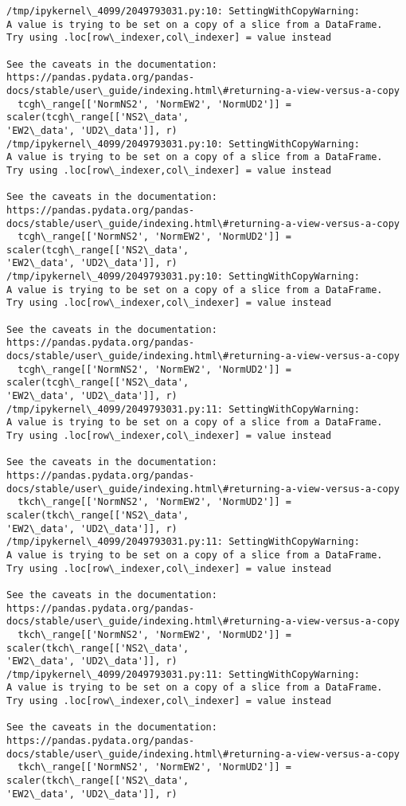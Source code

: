 \documentclass[11pt]{article}
\begin{document}
    \begin{Verbatim}[commandchars=\\\{\}]
/tmp/ipykernel\_4099/2049793031.py:10: SettingWithCopyWarning:
A value is trying to be set on a copy of a slice from a DataFrame.
Try using .loc[row\_indexer,col\_indexer] = value instead

See the caveats in the documentation: https://pandas.pydata.org/pandas-
docs/stable/user\_guide/indexing.html\#returning-a-view-versus-a-copy
  tcgh\_range[['NormNS2', 'NormEW2', 'NormUD2']] = scaler(tcgh\_range[['NS2\_data',
'EW2\_data', 'UD2\_data']], r)
/tmp/ipykernel\_4099/2049793031.py:10: SettingWithCopyWarning:
A value is trying to be set on a copy of a slice from a DataFrame.
Try using .loc[row\_indexer,col\_indexer] = value instead

See the caveats in the documentation: https://pandas.pydata.org/pandas-
docs/stable/user\_guide/indexing.html\#returning-a-view-versus-a-copy
  tcgh\_range[['NormNS2', 'NormEW2', 'NormUD2']] = scaler(tcgh\_range[['NS2\_data',
'EW2\_data', 'UD2\_data']], r)
/tmp/ipykernel\_4099/2049793031.py:10: SettingWithCopyWarning:
A value is trying to be set on a copy of a slice from a DataFrame.
Try using .loc[row\_indexer,col\_indexer] = value instead

See the caveats in the documentation: https://pandas.pydata.org/pandas-
docs/stable/user\_guide/indexing.html\#returning-a-view-versus-a-copy
  tcgh\_range[['NormNS2', 'NormEW2', 'NormUD2']] = scaler(tcgh\_range[['NS2\_data',
'EW2\_data', 'UD2\_data']], r)
/tmp/ipykernel\_4099/2049793031.py:11: SettingWithCopyWarning:
A value is trying to be set on a copy of a slice from a DataFrame.
Try using .loc[row\_indexer,col\_indexer] = value instead

See the caveats in the documentation: https://pandas.pydata.org/pandas-
docs/stable/user\_guide/indexing.html\#returning-a-view-versus-a-copy
  tkch\_range[['NormNS2', 'NormEW2', 'NormUD2']] = scaler(tkch\_range[['NS2\_data',
'EW2\_data', 'UD2\_data']], r)
/tmp/ipykernel\_4099/2049793031.py:11: SettingWithCopyWarning:
A value is trying to be set on a copy of a slice from a DataFrame.
Try using .loc[row\_indexer,col\_indexer] = value instead

See the caveats in the documentation: https://pandas.pydata.org/pandas-
docs/stable/user\_guide/indexing.html\#returning-a-view-versus-a-copy
  tkch\_range[['NormNS2', 'NormEW2', 'NormUD2']] = scaler(tkch\_range[['NS2\_data',
'EW2\_data', 'UD2\_data']], r)
/tmp/ipykernel\_4099/2049793031.py:11: SettingWithCopyWarning:
A value is trying to be set on a copy of a slice from a DataFrame.
Try using .loc[row\_indexer,col\_indexer] = value instead

See the caveats in the documentation: https://pandas.pydata.org/pandas-
docs/stable/user\_guide/indexing.html\#returning-a-view-versus-a-copy
  tkch\_range[['NormNS2', 'NormEW2', 'NormUD2']] = scaler(tkch\_range[['NS2\_data',
'EW2\_data', 'UD2\_data']], r)
    \end{Verbatim}
\end{document}
